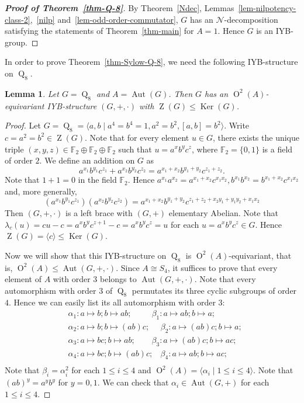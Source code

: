 \documentclass[12pt,a4paper]{article}
\DeclareMathOperator{\Oo}{O}
\DeclareMathOperator{\Z}{Z}
\DeclareMathOperator{\Ker}{Ker}
\DeclareMathOperator{\Aut}{Aut}
\DeclareMathOperator{\Q}{Q}
\newtheorem{lemma}[theorem]{Lemma}
\theoremstyle{definition}
\begin{document}
\begin{proof}[\textbf{\emph{Proof of Theorem~\ref{thm-Q-8}}}]
By Theorem~\ref{Ndec}, Lemmas~\ref{lem-nilpotency-class-2},~\ref{nilp} and~\ref{lem-odd-order-commutator}, $G$ has an $\mathcal{N}$-decomposition satisfying the statements of Theorem~\ref{thm-main} for $A = 1$. Hence $G$ is an IYB-group.
\end{proof}

In order to prove Theorem~\ref{thm-Sylow-Q-8}, we need the following IYB-structure on $\Q_8$.
\begin{lemma}\label{lem-IYB-Q-8}
Let $G=\Q_8$ and $A=\Aut(G)$. Then $G$ has an $\Oo^2(A)$-equivariant IYB-structure $(G,+,\cdot)$ with $\Z(G) \leq \Ker(G)$.
\end{lemma}
\begin{proof}
Let $G=\Q_8=\langle a,b \mid a^4=b^4=1, a^2=b^2, [a,b]=b^2\rangle$. Write $c=a^2=b^2 \in \Z(G)$.  Note that for every element $u \in G$, there exists the unique triple $(x,y,z) \in \mathbb{F}_2\oplus \mathbb{F}_2\oplus \mathbb{F}_2 $ such that $u=a^xb^yc^z$, where $\mathbb{F}_2=\{0,1\}$ is a field of order $2$. We define an addition on $G$ as
$$a^{x_1}b^{y_1}c^{z_1}+a^{x_2}b^{y_2}c^{z_2}= a^{x_1+x_2}b^{y_1+y_2}c^{z_1+z_2}.$$
Note that $1+1=0$ in the field $\mathbb{F}_2$. Hence $a^{x_1}a^{x_2}=a^{x_1+x_2}c^{x_1x_2}, b^{x_1}b^{x_2}=b^{x_1+x_2}c^{x_1x_2}$ and, more generally,
$$(a^{x_1}b^{y_1}c^{z_1})(a^{x_2}b^{y_2}c^{z_2})=a^{x_1+x_2} b^{y_1+y_2} c^{z_1+z_2+x_2y_1+y_1y_2+x_1x_2}$$
Then $(G,+,\cdot)$ is a left brace with $(G,+)$ elementary Abelian.
Note that $\lambda_c(u)=cu-c=a^xb^yc^{z+1}-c=a^xb^yc^z=u$ for each $u=a^xb^yc^z \in G$. Hence $\Z(G)=\langle c\rangle \leq \Ker(G)$.

Now we will show that this IYB-structure on $\Q_8$ is $\Oo^2(A)$-equivariant, that is,  $\Oo^2(A) \leq \Aut(G,+,\cdot)$. Since $A \cong S_4$, it suffices to prove that every element of $A$ with order $3$ belongs to $\Aut(G,+,\cdot)$. Note that every automorphism with order $3$ of $\Q_8$ permutates its three cyclic subgroups of order $4$. Hence we can easily list its all automorphism with order $3$:
$$
\begin{aligned}
&\alpha_1: a \mapsto b; b \mapsto ab;~~~~~~~~~~~\beta_1: a \mapsto ab; b \mapsto a;\\
&\alpha_2: a \mapsto b; b \mapsto (ab)c;~~~~~~\beta_2: a \mapsto (ab)c; b \mapsto a;\\
&\alpha_3: a \mapsto bc; b \mapsto ab;~~~~~~~~~\beta_3: a \mapsto (ab)c; b \mapsto ac;\\
&\alpha_4: a \mapsto bc; b \mapsto (ab)c;~~~~\beta_4: a \mapsto ab; b \mapsto ac;\\
\end{aligned}$$
Note that $\beta_i=\alpha_i^2$ for each $1 \leq i \leq 4$ and $\Oo^2(A)=\langle \alpha_i \mid 1 \leq i \leq 4 \rangle$.
Note that $(ab)^y=a^yb^y$ for $y=0,1$. We can check that $\alpha_i \in \Aut(G,+)$ for each $1 \leq i \leq 4$.


\end{proof}
\end{document}
